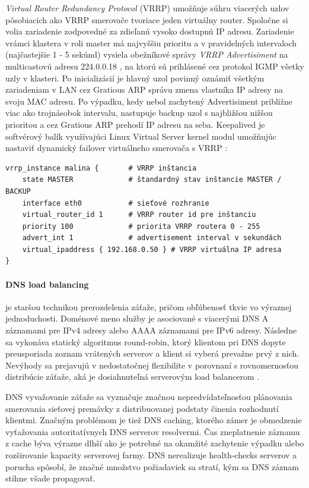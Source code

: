 \documentclass[12pt, a4paper]{article}
\begin{document}
\emph{Virtual Router Redundancy Protocol} (VRRP) umožňuje súhru viacerých uzlov pôsobiacich ako VRRP 
smerovače tvoriace jeden virtuálny router. Spoločne si volia zariadenie zodpovedné za zdieľanú vysoko 
dostupnú IP adresu. Zariadenie vrámci klastera v roli master má najvyššiu prioritu a v pravidelných 
intervaloch (najčastejšie 1 - 5 sekúnd) vysiela obežníkové správy \emph{VRRP Advertisiment} na multicastovú 
adresu 224.0.0.18 \cite{RFC2338}, na ktorú sú prihlásené cez protokol IGMP všetky uzly v klasteri. Po 
inicializácií je hlavný uzol povinný oznámiť všetkým zariadeniam v LAN cez Gratious ARP správu zmena 
vlastníka IP adresy na svoju MAC adresu. Po výpadku, kedy nebol zachytený Advertisiment približne viac ako 
trojnásobok intervalu, nastupuje backup uzol s najbližšou nižšou prioritou a cez Gratious ARP prehodí IP 
adresu na seba. Keepalived je softvérový balík využívajúci Linux Virtual Server kernel modul umožňujúc 
nastaviť dynamický failover virtuálneho smerovača s VRRP \cite{keepalived-docs}:
\begin{lstlisting}
vrrp_instance malina {       # VRRP inštancia
    state MASTER             # štandardný stav inštancie MASTER / BACKUP
    interface eth0           # sieťové rozhranie
    virtual_router_id 1      # VRRP router id pre inštanciu
    priority 100             # priorita VRRP routera 0 - 255
    advert_int 1             # advertisement interval v sekundách
    virtual_ipaddress { 192.168.0.50 } # VRRP virtuálna IP adresa
}
\end{lstlisting}

\paragraph{DNS load balancing} je staršou technikou prerozdelenia záťaže, pričom obľúbenosť tkvie vo 
výraznej jednoduchosti. Doménové meno služby je asociované s viacerými DNS A záznamami pre IPv4 adresy 
alebo AAAA záznamami pre IPv6 adresy. Následne sa vykonáva statický algoritmus round-robin, ktorý
klientom pri DNS dopyte preusporiada zoznam vrátených serverov a klient si vyberá prevažne prvý z nich. 
Nevýhody sa prejavujú v nedostatočnej flexibilite v porovnaní s rovnomernosťou distribúcie záťaže, aká je 
dosiahnuteľná serverovým load balancerom \cite{server-load-balancing}. 

DNS vyvažovanie záťaže sa vyznačuje značnou nepredvídateľnosťou plánovania smerovania 
sieťovej premávky z distribuovanej podstaty činenia rozhodnutí klientmi. Značným problémom je tiež DNS 
caching, ktorého zámer je obmedzenie vyťažovania autoritatívnych DNS serverov resolvermi. Čas zneplatnenie 
záznamu z cache býva výrazne dlhší ako je potrebné  na okamžité zachytenie výpadku alebo rozširovanie 
kapacity serverovej farmy. DNS nerealizuje health-checks serverov a porucha spôsobí, že značné množstvo 
požiadaviek sa stratí, kým sa DNS záznam stihne všade propagovať.
\end{document}
